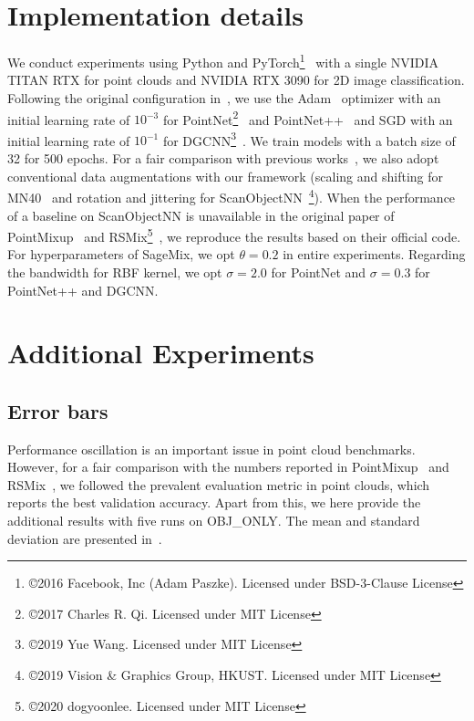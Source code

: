 \documentclass{article}
\begin{document}
\section{Implementation details}
\label{sec:implementation}
We conduct experiments using Python and PyTorch\footnote{\copyright 2016 Facebook, Inc (Adam Paszke). Licensed under BSD-3-Clause License}~\cite{paszke2019pytorch} with a single NVIDIA TITAN RTX for point clouds and NVIDIA RTX 3090 for 2D image classification.
Following the original configuration in~\cite{qi2017pointnet,qi2017pointnet++,wang2019dynamic}, we use the Adam~\cite{DBLP:journals/corr/KingmaB14} optimizer with an initial learning rate of $10^{-3}$ for PointNet\footnote{\label{note1}\copyright 2017 Charles R. Qi. Licensed under MIT License}~\cite{qi2017pointnet} and PointNet++~\cite{qi2017pointnet++} and SGD with an initial learning rate of $10^{-1}$ for DGCNN\footnote{\copyright 2019 Yue Wang. Licensed under MIT License }~\cite{wang2019dynamic}. We train models with a batch size of 32 for 500 epochs.
For a fair comparison with previous works~\cite{chen2020pointmixup,lee2021regularization}, we also adopt conventional data augmentations with our framework (\ie scaling and shifting for MN40~\cite{3dwarehouse} and rotation and jittering for ScanObjectNN~\footnote{\copyright 2019 Vision \& Graphics Group, HKUST. Licensed under MIT License}\cite{uy2019revisiting}). When the performance of a baseline on ScanObjectNN is unavailable in the original paper of PointMixup~\cite{chen2020pointmixup} and RSMix\footnote{\copyright 2020 dogyoonlee. Licensed under MIT License}~\cite{lee2021regularization}, we reproduce the results based on their official code.
For hyperparameters of SageMix, we opt $\theta=0.2$ in entire experiments. Regarding the bandwidth for RBF kernel, we opt $\sigma=2.0$ for PointNet and $\sigma=0.3$ for PointNet++ and DGCNN.
 \section{Additional Experiments}
\label{sec:experiments}

\subsection{Error bars}
\label{sec:errorbars}
Performance oscillation is an important issue in point cloud benchmarks. However, for a fair comparison with the numbers reported in PointMixup~\cite{chen2020pointmixup} and RSMix~\cite{lee2021regularization}, we followed the prevalent evaluation metric in point clouds, which reports the best validation accuracy. Apart from this, we here provide the additional results with five runs on OBJ\_ONLY. The mean and standard deviation are presented in~.
\end{document}
